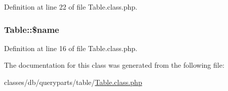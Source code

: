 Definition at line 22 of file Table.\+class.\+php.

\subsubsection[{\texorpdfstring{\$name}{$name}}]{\setlength{\rightskip}{0pt plus 5cm}Table\+::\$name}\hypertarget{classTable_a7c7f5d88257a02dd1fbeee22a77c7f39}{}\label{classTable_a7c7f5d88257a02dd1fbeee22a77c7f39}


Definition at line 16 of file Table.\+class.\+php.



The documentation for this class was generated from the following file\+:\begin{DoxyCompactItemize}
\item 
classes/db/queryparts/table/\hyperlink{Table_8class_8php}{Table.\+class.\+php}\end{DoxyCompactItemize}
